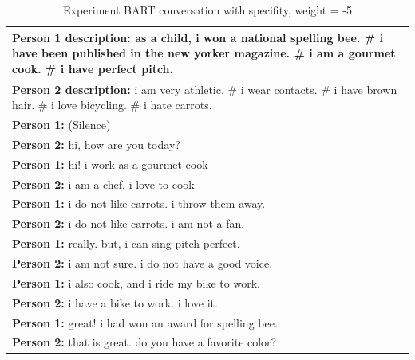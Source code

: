 \begin{table}[ht]
\centering
 \begin{tabular}{|p{14cm}|} 
 \hline\hline
 \textbf{Person 1 description:} as a child, i won a national spelling bee. \# i have been published in the new yorker magazine. \# i am a gourmet cook. \# i have perfect pitch. \\
 \hline
 \textbf{Person 2 description:} i am very athletic. \# i wear contacts. \# i have brown hair. \# i love bicycling. \# i hate carrots. \\
 \hline\hline
 \textbf{Person 1:} (Silence) \\
 \textbf{Person 2:} hi, how are you today? \\ 
 \textbf{Person 1:} hi! i work as a gourmet cook \\
 \textbf{Person 2:} i am a chef. i love to cook \\
 \textbf{Person 1:} i do not like carrots. i throw them away. \\
 \textbf{Person 2:} i do not like carrots. i am not a fan. \\
 \textbf{Person 1:} really. but, i can sing pitch perfect. \\
 \textbf{Person 2:} i am not sure. i do not have a good voice. \\
 \textbf{Person 1:} i also cook, and i ride my bike to work. \\
 \textbf{Person 2:} i have a bike to work. i love it. \\
 \textbf{Person 1:} great! i had won an award for spelling bee. \\
 \textbf{Person 2:} that is great. do you have a favorite color? \\
 \hline\hline
 \end{tabular}
 \caption{Experiment BART conversation with specifity, weight = -5}
\label{tab:bart_conversation_idf-5_ap}
\end{table}

